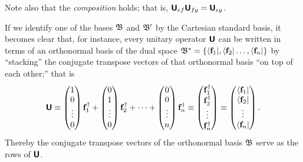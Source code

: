 Note also that the {\em composition} holds; that is, $\textsf{\textbf{U}}_{ef} \textsf{\textbf{U}}_{fg}=  \textsf{\textbf{U}}_{eg}$.



If we
identify one of the bases  ${\frak B}$ and ${\frak B}'$ by the Cartesian standard basis,
it becomes clear that, for instance,
every unitary operator  $\textsf{\textbf{U}}$  can be written in terms of an orthonormal basis  of the dual space
${\frak B}^\ast=\{ \langle {\bf f}_1  \vert     ,   \langle {\bf f}_2  \vert      \ldots ,  \langle {\bf f}_n  \vert     \}$
by ``stacking'' the conjugate transpose vectors of that orthonormal basis ``on top of each other;''
that is
\begin{equation}
\textsf{\textbf{U}}
\equiv
\begin{pmatrix}
1\\
0\\
\vdots\\
0
\end{pmatrix} {\bf f}_1^\dagger
+
\begin{pmatrix}
0\\
1\\
\vdots\\
0
\end{pmatrix} {\bf f}_2^\dagger
+
\cdots +
\begin{pmatrix}
0\\
0\\
\vdots\\
n
\end{pmatrix} {\bf f}_n^\dagger
\equiv
\begin{pmatrix}
{\bf f}_1^\dagger\\
{\bf f}_2^\dagger\\
\vdots\\
{\bf f}_n^\dagger
\end{pmatrix}
\equiv
\begin{pmatrix}
\langle {\bf f}_1\vert \\
\langle {\bf f}_2\vert\\
\vdots\\
\langle {\bf f}_n\vert
\end{pmatrix}
.
\end{equation}
Thereby the conjugate transpose vectors of the orthonormal basis  ${\frak B}$ serve as the
rows of $\textsf{\textbf{U}}$.

